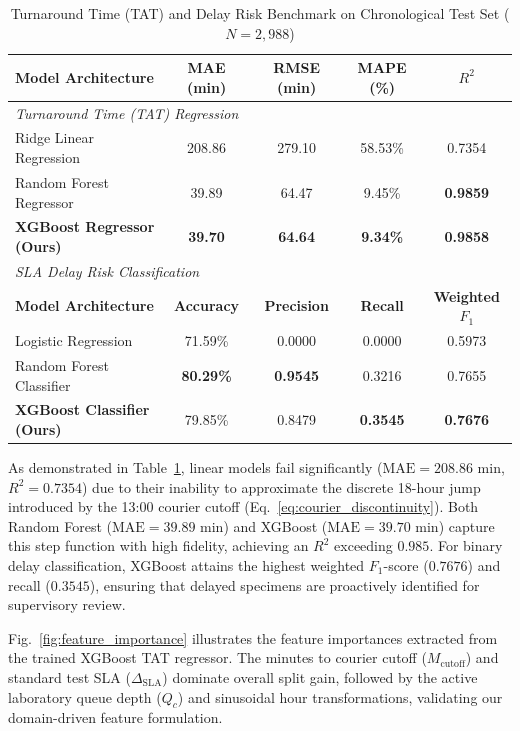 \documentclass[conference]{IEEEtran}
\begin{document}
\begin{table}[h]
\centering
\caption{Turnaround Time (TAT) and Delay Risk Benchmark on Chronological Test Set ($N=2,988$)}
\label{tab:tat_benchmark}
\renewcommand{\arraystretch}{1.15}
\begin{tabularx}{\columnwidth}{lcccc}
\toprule
\textbf{Model Architecture} & \textbf{MAE (min)} & \textbf{RMSE (min)} & \textbf{MAPE (\%)} & \textbf{$R^2$} \\
\midrule
\multicolumn{5}{l}{\textit{Turnaround Time (TAT) Regression}} \\
Ridge Linear Regression & 208.86 & 279.10 & 58.53\% & 0.7354 \\
Random Forest Regressor & 39.89 & 64.47 & 9.45\% & \textbf{0.9859} \\
\textbf{XGBoost Regressor (Ours)} & \textbf{39.70} & \textbf{64.64} & \textbf{9.34\%} & \textbf{0.9858} \\
\midrule
\multicolumn{5}{l}{\textit{SLA Delay Risk Classification}} \\
\textbf{Model Architecture} & \textbf{Accuracy} & \textbf{Precision} & \textbf{Recall} & \textbf{Weighted $F_1$} \\
Logistic Regression & 71.59\% & 0.0000 & 0.0000 & 0.5973 \\
Random Forest Classifier & \textbf{80.29\%} & \textbf{0.9545} & 0.3216 & 0.7655 \\
\textbf{XGBoost Classifier (Ours)} & 79.85\% & 0.8479 & \textbf{0.3545} & \textbf{0.7676} \\
\bottomrule
\end{tabularx}
\end{table}

As demonstrated in Table~\ref{tab:tat_benchmark}, linear models fail significantly ($\text{MAE} = 208.86$ min, $R^2 = 0.7354$) due to their inability to approximate the discrete 18-hour jump introduced by the 13:00 courier cutoff (Eq.~\ref{eq:courier_discontinuity}). Both Random Forest ($\text{MAE} = 39.89$ min) and XGBoost ($\text{MAE} = 39.70$ min) capture this step function with high fidelity, achieving an $R^2$ exceeding $0.985$. For binary delay classification, XGBoost attains the highest weighted $F_1$-score ($0.7676$) and recall ($0.3545$), ensuring that delayed specimens are proactively identified for supervisory review.

Fig.~\ref{fig:feature_importance} illustrates the feature importances extracted from the trained XGBoost TAT regressor. The minutes to courier cutoff ($M_{\text{cutoff}}$) and standard test SLA ($\Delta_{\text{SLA}}$) dominate overall split gain, followed by the active laboratory queue depth ($Q_c$) and sinusoidal hour transformations, validating our domain-driven feature formulation.
\end{document}
